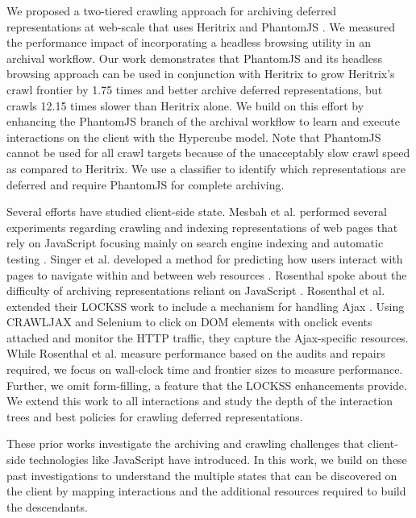 \documentclass{sig-alternate}
\begin{document}
We proposed a two-tiered crawling approach for archiving deferred representations at web-scale that uses Heritrix and PhantomJS \cite{crawlingDeferred}. We measured the performance impact of incorporating a headless browsing utility in an archival workflow. Our work demonstrates that PhantomJS \cite{pjs} and its headless browsing approach can be used in conjunction with Heritrix to grow Heritrix's crawl frontier by 1.75 times and better archive deferred representations, but crawls 12.15 times slower than Heritrix alone. We build on this effort by enhancing the PhantomJS branch of the archival workflow to learn and execute interactions on the client with the Hypercube model. Note that PhantomJS cannot be used for all crawl targets because of the unacceptably slow crawl speed as compared to Heritrix. We use a classifier to identify which representations are deferred and require PhantomJS for complete archiving. 

Several efforts have studied client-side state. Mesbah et al. performed several experiments regarding crawling and indexing representations of web pages that rely on JavaScript \cite{mesbahCrawling, mesbahInferState} focusing mainly on search engine indexing and automatic testing \cite{mesbahTesting, mesbah2}. Singer et al. developed a method for predicting how users interact with pages to navigate within and between web resources \cite{hyptrails}. Rosenthal spoke about the difficulty of archiving representations reliant on JavaScript \cite{iipc2013, futureWeb}. Rosenthal et al. extended their LOCKSS work to include a mechanism for handling Ajax \cite{dshrDlib}. Using CRAWLJAX and Selenium to click on DOM elements with onclick events attached and monitor the HTTP traffic, they capture the Ajax-specific resources. While Rosenthal et al. measure performance based on the audits and repairs required, we focus on wall-clock time and frontier sizes to measure performance. Further, we omit form-filling, a feature that the LOCKSS enhancements provide. We extend this work to all interactions and study the depth of the interaction trees and best policies for crawling deferred representations.

These prior works investigate the archiving and crawling challenges that client-side technologies like JavaScript have introduced. In this work, we build on these past investigations to understand the multiple states that can be discovered on the client by mapping interactions and the additional resources required to build the descendants.
\\
\end{document}
